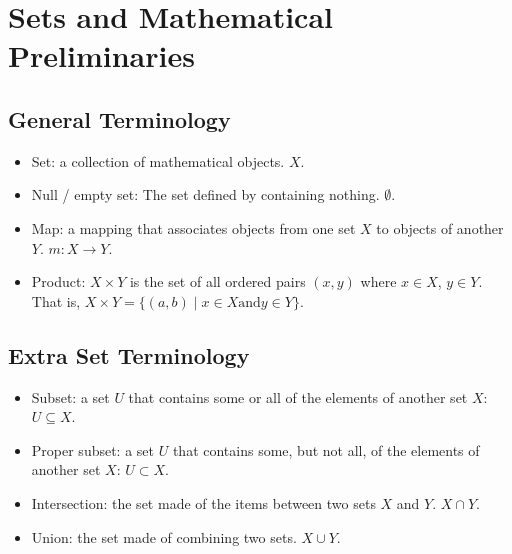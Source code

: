 \chapter{Sets and Mathematical Preliminaries}
\section{General Terminology}
\begin{itemize}
    \item Set: a collection of mathematical objects. $X$.
    \item Null / empty set: The set defined by containing nothing. $\emptyset$.
    \item Map: a mapping that associates objects from one set $X$ to objects of another $Y$. $m: X\rightarrow Y$.
    \item Product: $X\times Y$ is the set of all ordered pairs $(x,y)$ where $x\in X$, $y\in Y$. That is, $X\times Y=\{ (a, b) \;|\; x\in X \text{and} y\in Y\}$.
\end{itemize}

\section{Extra Set Terminology}
\begin{itemize}
    \item Subset: a set $U$ that contains some or all of the elements of another set $X$: $U\subseteq X$.
    \item Proper subset: a set $U$ that contains some, but not all, of the elements of another set $X$: $U\subset X$.
    \item Intersection: the set made of the items between two sets $X$ and $Y$. $X\cap Y$.
    \item Union: the set made of combining two sets. $X\cup Y$.
\end{itemize}

